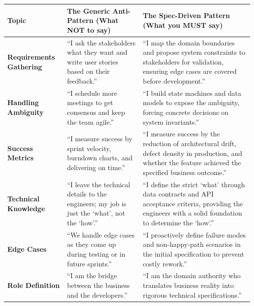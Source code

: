\documentclass[
  11pt,
  openany,
  oneside]{book}
\begin{document}
\begin{longtable}[]{@{}
  >{\raggedright\arraybackslash}p{}
  >{\raggedright\arraybackslash}p{}
  >{\raggedright\arraybackslash}p{}@{}}
\toprule\noalign{}
\begin{minipage}[b]{\linewidth}\raggedright
Topic
\end{minipage} & \begin{minipage}[b]{\linewidth}\raggedright
The Generic Anti-Pattern (What NOT to say)
\end{minipage} & \begin{minipage}[b]{\linewidth}\raggedright
The Spec-Driven Pattern (What you MUST say)
\end{minipage} \\
\midrule\noalign{}
\endhead
\bottomrule\noalign{}
\endlastfoot
\textbf{Requirements Gathering} & ``I ask the stakeholders what they
want and write user stories based on their feedback.'' & ``I map the
domain boundaries and propose system constraints to stakeholders for
validation, ensuring edge cases are covered before development.'' \\
\textbf{Handling Ambiguity} & ``I schedule more meetings to get
consensus and keep the team agile.'' & ``I build state machines and data
models to expose the ambiguity, forcing concrete decisions on system
invariants.'' \\
\textbf{Success Metrics} & ``I measure success by sprint velocity,
burndown charts, and delivering on time.'' & ``I measure success by the
reduction of architectural drift, defect density in production, and
whether the feature achieved the specified business outcome.'' \\
\textbf{Technical Knowledge} & ``I leave the technical details to the
engineers; my job is just the `what', not the `how'.'' & ``I define the
strict `what' through data contracts and API acceptance criteria,
providing the engineers with a solid foundation to determine the
`how'.'' \\
\textbf{Edge Cases} & ``We handle edge cases as they come up during
testing or in future sprints.'' & ``I proactively define failure modes
and non-happy-path scenarios in the initial specification to prevent
costly rework.'' \\
\textbf{Role Definition} & ``I am the bridge between the business and
the developers.'' & ``I am the domain authority who translates business
reality into rigorous technical specifications.'' \\
\end{longtable}
\end{document}
